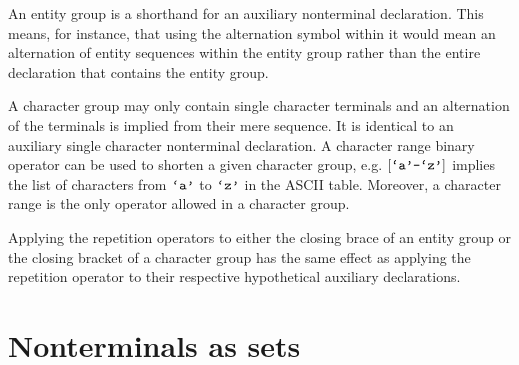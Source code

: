 An entity group is a shorthand for an auxiliary nonterminal declaration. This
means, for instance, that using the alternation symbol within it would mean an
alternation of entity sequences within the entity group rather than the entire
declaration that contains the entity group.

A character group may only contain single character terminals and an
alternation of the terminals is implied from their mere sequence. It is
identical to an auxiliary single character nonterminal declaration. A character
range binary operator can be used to shorten a given character group, e.g.
$[\text{{\ttfamily`a'}}\text{{\ttfamily-}}\text{{\ttfamily`z'}}]$ implies the list of characters from $\text{{\ttfamily`a'}}$
to $\text{{\ttfamily`z'}}$ in the ASCII table.  Moreover, a character range is the only
operator allowed in a character group.

Applying the repetition operators to either the closing brace of an entity
group or the closing bracket of a character group has the same effect as
applying the repetition operator to their respective hypothetical auxiliary
declarations.

\section{Nonterminals as sets}
